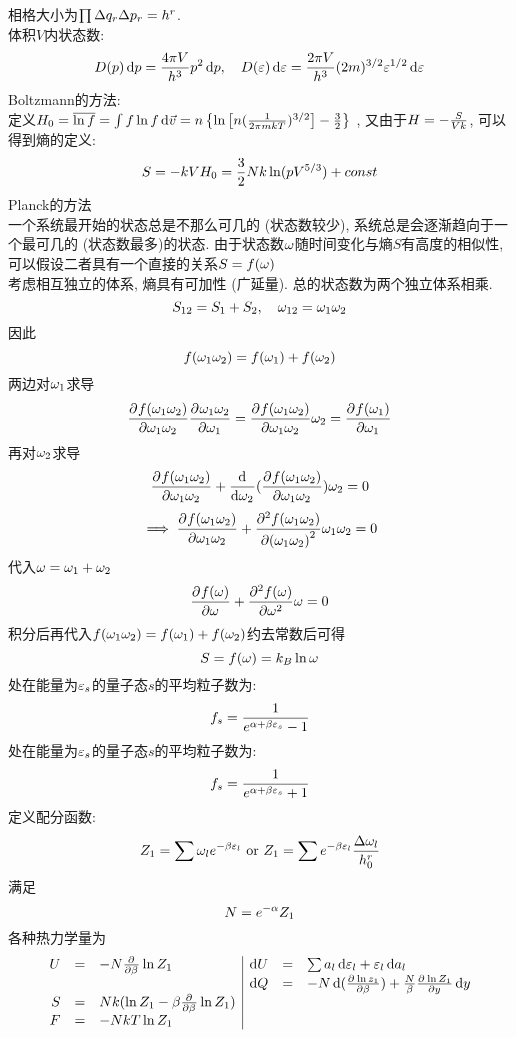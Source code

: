 \documentclass[UTF8,8pt]{ctexart}
\begin{document}
\begin{multicols}{3}
    相格大小为$\prod \D q_r\D p_r=h^r$.\\
    体积$V$内状态数:
    $$D(p)\d p=\f{4\pi V}{h^3}p^2 \d p, \quad D(\ep)\d\ep = \f{2\pi V}{h^3}(2m)^{3/2}\ep^{1/2}\d\ep$$
        Boltzmann的方法: \\
        定义$H_0=\bar{\ln f}=\int f\ln f\d\vec v= n\left\{\ln\left[n(\ff{2\pi mkT})^{3/2}\right]-\f{3}{2}\right\}$ , 又由于$H=-\f{S}{Vk}$, 可以得到熵的定义: 
        $$S=-kVH_0=\f{3}{2}Nk\ln (pV^{5/3})+const$$
        Planck的方法\\
        一个系统最开始的状态总是不那么可几的 (状态数较少), 系统总是会逐渐趋向于一个最可几的 (状态数最多)的状态. 由于状态数$\o$随时间变化与熵$S$有高度的相似性, 可以假设二者具有一个直接的关系$S=f(\o)$\\
        考虑相互独立的体系, 熵具有可加性 (广延量). 总的状态数为两个独立体系相乘. 
        $$S_{12}=S_1+S_2,\quad \o_{12}=\o_1\o_2$$
        因此
        $$f(\o_1\o_2)=f(\o_1)+f(\o_2)$$
        两边对$\o_1$求导
        $$\pp{f(\o_1\o_2)}{\o_1\o_2}\pp{\o_1\o_2}{\o_1}=\pp{f(\o_1\o_2)}{\o_1\o_2}\o_2=\pp{f(\o_1)}{\o_1}$$
        再对$\o_2$求导
        $$\pp{f(\o_1\o_2)}{\o_1\o_2}+\dd{}{\o_2}(\pp{f(\o_1\o_2)}{\o_1\o_2})\o_2=0$$
        $$\ip \pp{f(\o_1\o_2)}{\o_1\o_2}+\pp[2]{f(\o_1\o_2)}{(\o_1\o_2)}\o_1\o_2=0$$
        代入$\o=\o_1+\o_2$
        $$\pp{f(\o)}{\o}+\pp[2]{f(\o)}{\o}\o=0$$
        积分后再代入$f(\o_1\o_2)=f(\o_1)+f(\o_2)$约去常数后可得
        $$S=f(\o)=k_B\ln \o$$
    处在能量为$\ep_s$的量子态$s$的平均粒子数为:
    $$f_s=\ff{e^{\a+\b\ep_s}-1}$$
    处在能量为$\ep_s$的量子态$s$的平均粒子数为:
    $$f_s=\ff{e^{\a+\b\ep_s}+1}$$
    定义配分函数:
    $$Z_1=\sum \o_le^{-\b\ep_l}\text{  or  }Z_1=\sum e^{-\b\ep_l}\f{\D \o_l}{h_0^r}$$
    满足$$N=e^{-\a}Z_1$$
    各种热力学量为
    $$\begin{array}{rcl|rcl}
        U & = & -N\pp{}{\b}\ln Z_1             & \d U & = & \sum a_l\d \ep_l+\ep_l\d a_l                        \\
          &   &                                & \d Q & = & -N\d(\pp{\ln z_1}{\b})+\f{N}{\b}\pp{\ln Z_1}{y}\d y \\
        S & = & Nk(\ln Z_1-\b\pp{}{\b}\ln Z_1) &      &   &                                                     \\
        F & = & -NkT\ln Z_1                    &      &   &                                                    
        \end{array}$$

\end{multicols}
\end{document}
